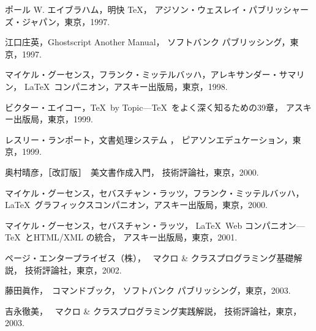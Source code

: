\documentclass[a4paper,10pt,onecolumn,oneside,openany]{jsbook}
\begin{document}
\begin{thebibliography}{99}
ポール W. エイブラハム，明快 \TeX{}，
アジソン・ウェスレイ・パブリッシャーズ・ジャパン，東京，1997. 

江口庄英，Ghostscript Another Manual，
ソフトバンク パブリッシング，東京，1997. 

マイケル・グーセンス，フランク・ミッテルバッハ，アレキサンダー・サマリン，
\LaTeX\ コンパニオン，アスキー出版局，東京，1998. 

ビクター・エイコー，\TeX\ by Topic---\TeX\ をよく深く知るための39章，
アスキー出版局，東京，1999. 

レスリー・ランポート，文書処理システム \LaTeXe{}，
ピアソンエデュケーション，東京，1999. 

奥村晴彦，［改訂版］\LaTeXe\ 美文書作成入門，
技術評論社，東京，2000. 

マイケル・グーセンス，セバスチャン・ラッツ，フランク・ミッテルバッハ，
\LaTeX\ グラフィックスコンパニオン，アスキー出版局，東京，2000. 

マイケル・グーセンス，セバスチャン・ラッツ，
\LaTeX\ Web コンパニオン---\TeX\ とHTML/XML の統合，
アスキー出版局，東京，2001. 

ページ・エンタープライゼス\<（株）\<，
\LaTeXe\ マクロ \& クラスプログラミング基礎解説，
技術評論社，東京，2002. 

藤田眞作，\LaTeXe\ コマンドブック，
ソフトバンク パブリッシング，東京，2003. 

吉永徹美，
\LaTeXe\ マクロ \& クラスプログラミング実践解説，
技術評論社，東京，2003. 
\end{thebibliography}


\newpage
\printindex
%
%
\end{document}
